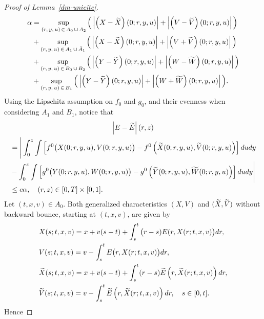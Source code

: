 \documentclass[10pt]{amsart}
\theoremstyle{definition}\newtheorem{defi}[theo]{Definition}\newtheorem{rema}[theo]{Remark}\newtheorem{exam}[theo]{Example}\newtheorem{exem}[theo]{Example}\newtheorem{nota}[theo]{Notation}
\let\oldtilde\tilde
\renewcommand*{\tilde}[1]{\mathchoice{\widetilde{#1}}{\widetilde{#1}}{\oldtilde{#1}}{\oldtilde{#1}}}
\begin{document}
\begin{proof}[{Proof of Lemma~\ref{dm-unicite}}]
\begin{align*}
\alpha &= \sup _{\left(r,\,y,\,u\right)\,\in\, A_0\,\cup\,A_2}\Big(\left| \left(X-\tilde{X}\right)(0;r,y,u)\right| +\left| \left(V-\tilde{V}\right)(0;r,y,u)\right| \Big) \\
&+\sup _{\left(r,\,y,\,u\right)\,\in\,A_1\,\cup \,\bar{A}_1}\Big(\left| \left(X-\tilde{X}\right)(0;r,y,u)\right| +\left| \left(V+\tilde{V}\right)(0;r,y,u)\right| \Big) \\
&+\sup _{\left(r,\,y,\,u\right)\,\in\,B_0\,\cup \,B_2}\Big(\left| \left(Y-\tilde{Y}\right)(0;r,y,u)\right| +\left| \left(W-\tilde{W}\right)(0;r,y,u)\right| \Big) \\
&+\sup _{\left(r,\,y,\,u\right)\,\in\,B_1}\Big(\left| \left(Y-\tilde{Y}\right)(0;r,y,u)\right| +\left| \left(W+\tilde{W}\right)(0;r,y,u)\right| \Big).
\end{align*}
Using the Lipschitz assumption on $f_0$ and $g_0$, and their evenness when considering $A_1$ and $B_1$, notice that
\begin{multline*}
\left|E-\tilde{E}\right|(r,z)\\
\begin{aligned}
&= \Bigg | \int_0^z\int \left[f^0\big(X(0; r,y,u),V(0;r,y,u)\big)-f ^0\left(\tilde{X}(0;r,y,u),\tilde{V}(0;r,y,u)\right) \right] dudy \\
&-\int_0^z\int \left [g^0\big(Y(0; r,y,u),W(0;r,y,u)\big)-g ^0\left(\tilde{Y}(0;r,y,u),\tilde{W}(0;r,y,u)\right) \right] dudy \Bigg | \\
&\leq c\alpha, \quad (r,z) \in [0,T] \times [0,1].
\end{aligned}
\end{multline*}
Let $(t,x,v)\in A_0$. Both generalized characteristics $(X,V)$ and $(\tilde{X},\tilde{V})$ without backward bounce, starting at $(t,x,v)$, are given by
\begin{align*}
&X(s;t,x,v)= x+v(s-t)+\int_s^t \big(r-s)E(r,X(r;t,x,v)\big)dr, \\
&V(s;t,x,v)= v-\int_s^t E\big(r,X(r;t,x,v)\big)dr, \\
&\tilde{X}(s;t,x,v)= x+v(s-t)+\int_s^t (r-s)\tilde{E}\left(r,\tilde{X}(r;t,x,v)\right)dr, \\
&\tilde{V}(s;t,x,v)= v-\int_s^t \tilde{E}\left(r,\tilde{X}(r;t,x,v)\right)dr,\quad s\in [0,t].
\end{align*}
Hence


\end{proof}
\end{document}
